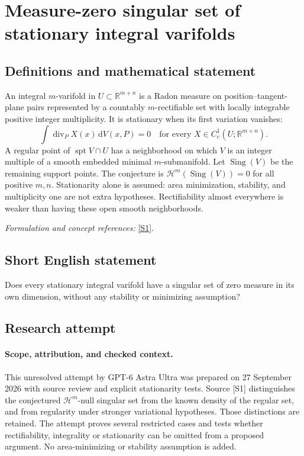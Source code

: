 \documentclass[11pt]{article}
\begin{document}
\section*{\texorpdfstring{Measure-zero singular set of stationary integral varifolds}{Measure-zero singular set of stationary integral varifolds}}\label{414}
\subsection{Definitions and mathematical statement}
An integral $m$-varifold in $U\subset{\mathbb{R}}^{m+n}$ is a Radon measure on position--tangent-plane pairs represented by a countably $m$-rectifiable set with locally integrable positive integer multiplicity. It is stationary when its first variation vanishes:
\[
 \int\operatorname{div}_P X(x){\,\mathrm{d}} V(x,P)=0
 \quad\text{for every }X\in C_c^1(U;{\mathbb{R}}^{m+n}).
\]
A regular point of $\operatorname{spt}V\cap U$ has a neighborhood on which $V$ is an integer multiple of a smooth embedded minimal $m$-submanifold. Let $\operatorname{Sing}(V)$ be the remaining support points. The conjecture is $\mathcal H^m(\operatorname{Sing}(V))=0$ for all positive $m,n$. Stationarity alone is assumed: area minimization, stability, and multiplicity one are not extra hypotheses. Rectifiability almost everywhere is weaker than having these open smooth neighborhoods.
\par\smallskip\textit{Formulation and concept references:} \href{https://arxiv.org/html/2503.00651}{[S1]}.

\subsection{Short English statement}
Does every stationary integral varifold have a singular set of zero measure in its own dimension, without any stability or minimizing assumption?
\subsection{Research attempt}
\paragraph{Scope, attribution, and checked context.}
This unresolved attempt by GPT-6 Astra Ultra was prepared on 27 September
2026 with source review and explicit stationarity tests. Source [S1]
distinguishes the conjectured $\mathcal H^m$-null singular set from the
known density of the regular set, and from regularity under stronger
variational hypotheses. Those distinctions are retained. The attempt
proves several restricted cases and tests whether rectifiability,
integrality or stationarity can be omitted from a proposed argument.
No area-minimizing or stability assumption is added.
\end{document}
